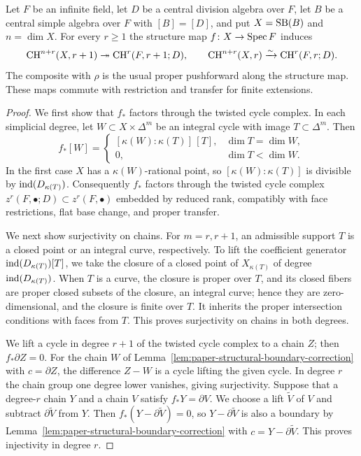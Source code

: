 \begin{lemma}\label{lem:integral-structural-push}
Let $F$ be an infinite field, let $D$ be a central division algebra over $F$, let $B$ be a central simple algebra over $F$ with $[B]=[D]$, and put $X=\operatorname{SB}(B)$ and $n=\dim X$.
For every $r\ge1$ the structure map $f\colon X\to\operatorname{Spec} F$ induces
\[
 \operatorname{CH}^{n+r}(X,r+1)\twoheadrightarrow\operatorname{CH}^r(F,r+1;D),\qquad
 \operatorname{CH}^{n+r}(X,r)\xrightarrow{\sim}\operatorname{CH}^r(F,r;D).
\]
The composite with $\rho$ is the usual proper pushforward along the structure map.
These maps commute with restriction and transfer for finite extensions.
\end{lemma}

\begin{proof}
We first show that $f_*$ factors through the twisted cycle complex.
In each simplicial degree, let $W\subset X\times\Delta^m$ be an integral cycle with image $T\subset\Delta^m$.
Then
\[
 f_*[W]=
 \begin{cases}
  [\kappa(W):\kappa(T)]\,[T], & \dim T=\dim W,\\
  0, & \dim T<\dim W.
 \end{cases}
\]
In the first case $X$ has a $\kappa(W)$-rational point, so $[\kappa(W):\kappa(T)]$ is divisible by $\operatorname{ind}(D_{\kappa(T)})$.
Consequently $f_*$ factors through the twisted cycle complex $z^r(F,\bullet;D)\subset z^r(F,\bullet)$ embedded by reduced rank, compatibly with face restrictions, flat base change, and proper transfer.

We next show surjectivity on chains.
For $m=r,r+1$, an admissible support $T$ is a closed point or an integral curve, respectively.
To lift the coefficient generator $\operatorname{ind}(D_{\kappa(T)})[T]$, we take the closure of a closed point of $X_{\kappa(T)}$ of degree $\operatorname{ind}(D_{\kappa(T)})$.
When $T$ is a curve, the closure is proper over $T$, and its closed fibers are proper closed subsets of the closure, an integral curve; hence they are zero-dimensional, and the closure is finite over $T$.
It inherits the proper intersection conditions with faces from $T$.
This proves surjectivity on chains in both degrees.

We lift a cycle in degree $r+1$ of the twisted cycle complex to a chain $Z$; then $f_*\partial Z=0$.
For the chain $W$ of Lemma~\ref{lem:paper-structural-boundary-correction} with $c=\partial Z$, the difference $Z-W$ is a cycle lifting the given cycle.
In degree $r$ the chain group one degree lower vanishes, giving surjectivity.
Suppose that a degree-$r$ chain $Y$ and a chain $V$ satisfy $f_*Y=\partial V$.
We choose a lift $\widetilde V$ of $V$ and subtract $\partial\widetilde V$ from $Y$.
Then $f_*(Y-\partial\widetilde V)=0$, so $Y-\partial\widetilde V$ is also a boundary by Lemma~\ref{lem:paper-structural-boundary-correction} with $c=Y-\partial\widetilde V$.
This proves injectivity in degree $r$.
\end{proof}

